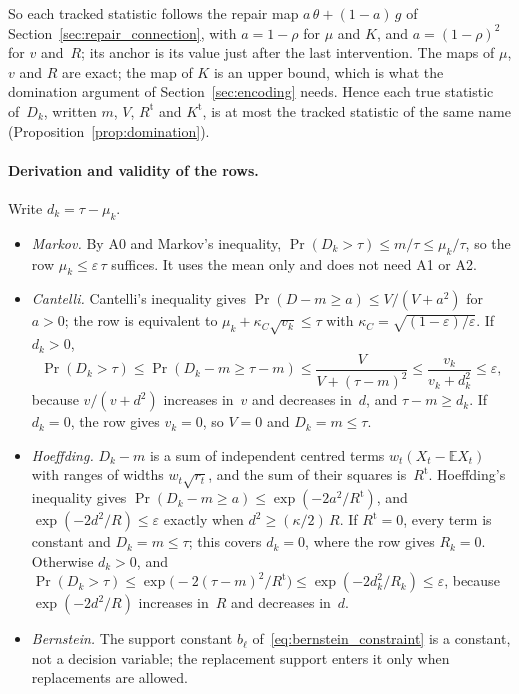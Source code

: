 \documentclass[11pt,a4paper]{article}
\theoremstyle{plain}
\theoremstyle{definition}
\theoremstyle{remark}
\begin{document}
So each tracked statistic follows the repair map $a\,\theta + (1-a)\,g$ of Section~\ref{sec:repair_connection}, with $a = 1-\rho$ for $\mu$ and $K$, and $a = (1-\rho)^2$ for $v$ and~$R$; its anchor is its value just after the last intervention.
The maps of $\mu$, $v$ and $R$ are exact; the map of $K$ is an upper bound, which is what the domination argument of Section~\ref{sec:encoding} needs.
Hence each true statistic of~$D_k$, written $m$, $V$, $R^{\mathrm{t}}$ and $K^{\mathrm{t}}$, is at most the tracked statistic of the same name (Proposition~\ref{prop:domination}).

\paragraph{Derivation and validity of the rows.}
Write $d_k = \tau - \mu_k$.
\begin{itemize}
  \item \emph{Markov.} By A0 and Markov's inequality, $\Pr(D_k > \tau) \le m/\tau \le \mu_k/\tau$, so the row $\mu_k \le \varepsilon\,\tau$ suffices.
    It uses the mean only and does not need A1 or A2.
  \item \emph{Cantelli.} Cantelli's inequality gives $\Pr(D - m \ge a) \le V/(V + a^2)$ for $a > 0$; the row is equivalent to $\mu_k + \kappa_C\sqrt{v_k} \le \tau$ with $\kappa_C = \sqrt{(1-\varepsilon)/\varepsilon}$.
    If $d_k > 0$,
    \[
      \Pr(D_k > \tau) \le \Pr(D_k - m \ge \tau - m) \le \frac{V}{V + (\tau - m)^2} \le \frac{v_k}{v_k + d_k^2} \le \varepsilon,
    \]
    because $v/(v + d^2)$ increases in~$v$ and decreases in~$d$, and $\tau - m \ge d_k$.
    If $d_k = 0$, the row gives $v_k = 0$, so $V = 0$ and $D_k = m \le \tau$.
  \item \emph{Hoeffding.} $D_k - m$ is a sum of independent centred terms $w_t(X_t - \mathbb{E}X_t)$ with ranges of widths $w_t\sqrt{r_t}$, and the sum of their squares is~$R^{\mathrm{t}}$.
    Hoeffding's inequality gives $\Pr(D_k - m \ge a) \le \exp(-2a^2/R^{\mathrm{t}})$, and $\exp(-2d^2/R) \le \varepsilon$ exactly when $d^2 \ge (\kappa/2)\,R$.
    If $R^{\mathrm{t}} = 0$, every term is constant and $D_k = m \le \tau$; this covers $d_k = 0$, where the row gives $R_k = 0$.
    Otherwise $d_k > 0$, and $\Pr(D_k > \tau) \le \exp\bigl(-2(\tau - m)^2/R^{\mathrm{t}}\bigr) \le \exp(-2d_k^2/R_k) \le \varepsilon$, because $\exp(-2d^2/R)$ increases in~$R$ and decreases in~$d$.
  \item \emph{Bernstein.} The support constant $b_\ell$ of~\eqref{eq:bernstein_constraint} is a constant, not a decision variable; the replacement support enters it only when replacements are allowed.

\end{itemize}
\end{document}
